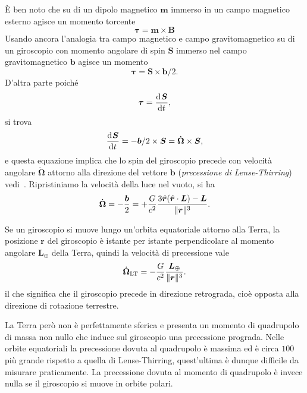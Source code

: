 È ben noto che su di un dipolo magnetico $\bm{m}$ immerso in un campo magnetico
esterno agisce un momento torcente
\begin{equation}
  \bm{\tau} = \bm{m} \times \bm{B}
\end{equation}
Usando ancora l'analogia tra campo magnetico e campo gravitomagnetico
su di un giroscopio con momento angolare di spin
$\bm{S}$ immerso nel campo gravitomagnetico $\bm{b}$ agisce un momento 
\begin{equation}
  \bm{\tau} = \bm{S} \times \bm{b}/2.
\end{equation}
D'altra parte poiché
\begin{equation}
  \bm{\tau} = \frac{{\mathop{}\!\mathrm{d}^{}}\bm{S}}{\mathop{}\!\mathrm{d} {t}^{}},
\end{equation}
si trova
\begin{equation}
  \frac{{\mathop{}\!\mathrm{d}^{}}\bm{S}}{\mathop{}\!\mathrm{d} {t}^{}} = - \bm{b}/2 \times \bm{S} = \dot{\bm{\Omega}} \times
  \bm{S},
\end{equation}
e questa equazione implica che lo spin del giroscopio precede con velocità
angolare $\dot{\bm{\Omega}}$ attorno alla direzione del vettore $\bm{b}$
(\emph{precessione di Lense-Thirring})
vedi~\textcite[193-195]{ohanian:gravitazione}.  Ripristiniamo la velocità della
luce nel vuoto, si ha
\begin{equation}
  \dot{\bm{\Omega}} = -\frac{\bm{b}}{2} =
  + \frac{G}{c^{2}}\frac{3\hat{\bm{r}}(\hat{\bm{r}} \cdot \bm{L}) -
    \bm{L}}{\lVert\bm{r}\rVert^{3}}.
\end{equation}

Se un giroscopio si muove lungo un'orbita equatoriale attorno alla Terra, la
posizione $\bm{r}$ del giroscopio è istante per istante perpendicolare al
momento angolare $\bm{L}_{\oplus}$ della Terra, quindi la velocità di
precessione vale
\begin{equation}
  \dot{\bm{\Omega}}_{\textup{LT}} = - \frac{G}{c^{2}}
  \frac{\bm{L}_{\oplus}}{\lVert\bm{r}\rVert^{3}}.
\end{equation}
il che significa che il giroscopio precede in direzione retrograda, cioè opposta
alla direzione di rotazione terrestre.

La Terra però non è perfettamente sferica e presenta un momento di quadrupolo di
massa non nullo che induce sul giroscopio una precessione prograda.  Nelle
orbite equatoriali la precessione dovuta al quadrupolo è massima ed è circa
$100$ più grande rispetto a quella di Lense-Thirring, quest'ultima è dunque
difficile da misurare praticamente.  La precessione dovuta al momento di
quadrupolo è invece nulla se il giroscopio si muove in orbite polari.

